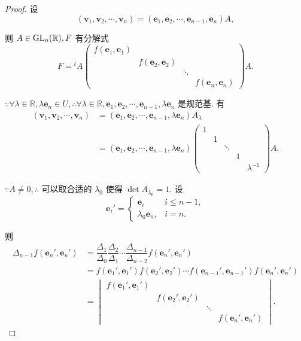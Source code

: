 \documentclass[color=black,device=normal,lang=cn,mode=geye]{elegantnote}
\begin{document}
\begin{proof}
    设
    \[(\boldsymbol{v}_1,\boldsymbol{v}_2,\cdots,\boldsymbol{v}_n)=(\boldsymbol{e}_1,\boldsymbol{e}_2,\cdots,\boldsymbol{e}_{n-1},\boldsymbol{e}_n)A,\]

    则 $A\in\operatorname{GL}_n(\mathbb{R}),F$ 有分解式
    \begin{equation}\label{eq3.3}
        F={}^tA\begin{pmatrix}
            f(\boldsymbol{e}_1,\boldsymbol{e}_1) \\
            & f(\boldsymbol{e}_2,\boldsymbol{e}_2) \\
            && \ddots \\
            &&& f(\boldsymbol{e}_n,\boldsymbol{e}_n)
        \end{pmatrix}A.
    \end{equation}

    $\because\forall\lambda\in\mathbb{R},\lambda\boldsymbol{e}_n\in U,\therefore\forall\lambda\in\mathbb{R},\boldsymbol{e}_1,\boldsymbol{e}_2,\cdots,\boldsymbol{e}_{n-1},\lambda\boldsymbol{e}_n$ 是规范基. 有
    \begin{align*}
        (\boldsymbol{v}_1,\boldsymbol{v}_2,\cdots,\boldsymbol{v}_n) & =(\boldsymbol{e}_1,\boldsymbol{e}_2,\cdots,\boldsymbol{e}_{n-1},\lambda\boldsymbol{e}_n)A_\lambda \\
        & =(\boldsymbol{e}_1,\boldsymbol{e}_2,\cdots,\boldsymbol{e}_{n-1},\lambda\boldsymbol{e}_n)\begin{pmatrix}
            1 \\
            & 1 \\
            && \ddots \\
            &&& 1 \\
            &&&& \lambda^{-1}
        \end{pmatrix}A.
    \end{align*}

    $\because A\neq0,\therefore$ 可以取合适的 $\lambda_0$ 使得 $\det A_{\lambda_0}=1$. 设
    \[\boldsymbol{e}_i'=\begin{cases}
        \boldsymbol{e}_i & i\leq n-1, \\
        \lambda_0\boldsymbol{e}_n, & i=n.
    \end{cases}\]

    则
    \begin{align*}
        \Delta_{n-1}f(\boldsymbol{e}_n',\boldsymbol{e}_n') & =\dfrac{\Delta_1}{\Delta_0}\dfrac{\Delta_2}{\Delta_1}\cdots\dfrac{\Delta_{n-1}}{\Delta_{n-2}}f(\boldsymbol{e}_n',\boldsymbol{e}_n') \\
        & =f(\boldsymbol{e}_1',\boldsymbol{e}_1')f(\boldsymbol{e}_2',\boldsymbol{e}_2')\cdots f(\boldsymbol{e}_{n-1}',\boldsymbol{e}_{n-1}')f(\boldsymbol{e}_n',\boldsymbol{e}_n') \\
        & =\begin{vmatrix}
            f(\boldsymbol{e}_1',\boldsymbol{e}_1') \\
            & f(\boldsymbol{e}_2',\boldsymbol{e}_2') \\
            && \ddots \\
            &&& f(\boldsymbol{e}_n',\boldsymbol{e}_n')
        \end{vmatrix}.
    \end{align*}


\end{proof}
\end{document}
